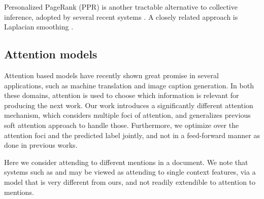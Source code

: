  Personalized PageRank (PPR) \cite{jeh2003scaling} is another tractable alternative to collective inference, adopted by several recent systems \cite{Han2011,He13,Alhelbawy14,Pershina2015}. A closely related approach is Laplacian smoothing \cite{Huang2014}.  

\subsection{Attention models}
Attention based models have recently shown great promise in several applications, such as machine translation and image caption generation. In both these domains, attention is used to choose which information is relevant for producing the next work. Our work introduces a significantly different attention mechanism, which considers multiple foci of attention, and generalizes previous soft attention approach to handle those. Furthermore, we optimize
over the attention foci and the predicted label jointly, and not in a feed-forward manner as done in previous works.

Here we consider attending to different mentions in a document. We note that systems such as  and  may be viewed as
attending to single context features, via a model that is very different from ours, and not readily extendible to attention to mentions.



